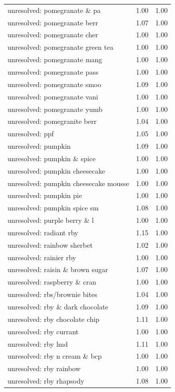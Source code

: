 \begin{table}
\begin{tabular}{lrr}
unresolved: pomegranate \& pa & 1.00 & 1.00 \\
unresolved: pomegranate berr & 1.07 & 1.00 \\
unresolved: pomegranate cher & 1.00 & 1.00 \\
unresolved: pomegranate green tea & 1.00 & 1.00 \\
unresolved: pomegranate mang & 1.00 & 1.00 \\
unresolved: pomegranate pass & 1.00 & 1.00 \\
unresolved: pomegranate smoo & 1.09 & 1.00 \\
unresolved: pomegranate vani & 1.00 & 1.00 \\
unresolved: pomegranate yumb & 1.00 & 1.00 \\
unresolved: pomegranite berr & 1.04 & 1.00 \\
unresolved: ppf & 1.05 & 1.00 \\
unresolved: pumpkin & 1.09 & 1.00 \\
unresolved: pumpkin \& spice & 1.00 & 1.00 \\
unresolved: pumpkin cheesecake & 1.00 & 1.00 \\
unresolved: pumpkin cheesecake mousse & 1.00 & 1.00 \\
unresolved: pumpkin pie & 1.00 & 1.00 \\
unresolved: pumpkin spice sm & 1.08 & 1.00 \\
unresolved: purple berry \& l & 1.00 & 1.00 \\
unresolved: radiant rby & 1.15 & 1.00 \\
unresolved: rainbow sherbet & 1.02 & 1.00 \\
unresolved: rainier rby & 1.00 & 1.00 \\
unresolved: raisin \& brown sugar & 1.07 & 1.00 \\
unresolved: raspberry \& cran & 1.00 & 1.00 \\
unresolved: rbs/brownie bites & 1.04 & 1.00 \\
unresolved: rby \& dark chocolate & 1.09 & 1.00 \\
unresolved: rby chocolate chip & 1.11 & 1.00 \\
unresolved: rby currant & 1.00 & 1.00 \\
unresolved: rby lmd & 1.11 & 1.00 \\
unresolved: rby n cream \& bcp & 1.00 & 1.00 \\
unresolved: rby rainbow & 1.00 & 1.00 \\
unresolved: rby rhapsody & 1.08 & 1.00 \\

\end{tabular}
\end{table}
